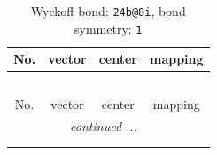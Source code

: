 \documentclass[fleqn,8pt]{jsarticle}
\begin{document}
\renewcommand{\arraystretch}{1.2}
\begin{longtable}{cccc}
\caption{Wyckoff bond: {\tt 24b@8i}, bond symmetry: {\tt 1}}
 \\
 \hline \hline
No. & vector & center & mapping \\ \hline \endfirsthead

\multicolumn{3}{l}{\tablename\ \thetable{}} \\
 \hline \hline
No. & vector & center & mapping \\ \hline \endhead

 \hline \hline
\multicolumn{3}{r}{\footnotesize\it continued ...} \\ \endfoot

 \hline \hline
\multicolumn{3}{r}{} \\ \endlastfoot


\end{longtable}
\end{document}
